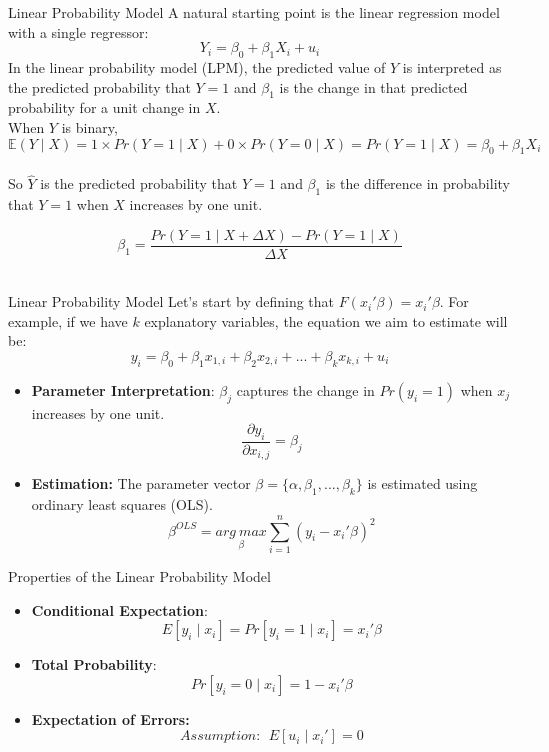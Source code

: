 \documentclass[notes,10pt, aspectratio=169]{beamer}
\begin{document}
\begin{frame}{Linear Probability Model}
A natural starting point is the linear regression model with a single regressor:
\begin{equation*}
    Y_i = \beta_0 + \beta_1 X_i +u_i
\end{equation*}
In the linear probability model (LPM), the predicted value of $Y$ is interpreted as the predicted probability that $Y=1$ and $\beta_1$ is the change in that predicted probability for a unit change in $X$.\\[1em]

When $Y$ is binary,
\begin{equation*}
    \mathbb{E}(Y\mid X) = 1 \times Pr(Y=1\mid X) + 0 \times  Pr(Y=0\mid X) = Pr(Y=1\mid X)= \beta_0 + \beta_1 X_i
\end{equation*}\\[1em]

So $\hat{Y}$ is the predicted probability that $Y=1$ and $\beta_1$ is the difference in probability that $Y=1$ when $X$ increases by one unit.

\begin{equation*}
    \beta_1 = \frac{Pr(Y=1\mid X + \Delta X)-Pr(Y=1\mid X)}{\Delta X}
\end{equation*}\\[1em]
\end{frame}


\begin{frame}{Linear Probability Model}
Let's start by defining that $F(x_i'\beta)=x_i'\beta$. For example, if we have $k$ explanatory variables, the equation we aim to estimate will be:
\[
y_i=\beta_0+\beta_1x_{1,i}+\beta_2x_{2,i}+...+\beta_kx_{k,i}+u_i
\]
\begin{itemize}
    \item \textbf{Parameter Interpretation}: $\beta_j$ captures the change in $Pr(y_i=1)$ when $x_j$ increases by one unit.
    \[\frac{\partial y_i}{\partial x_{i,j}}=\beta_j\]
    \item \textbf{Estimation:} The parameter vector $\beta=\{\alpha, \beta_1,...,\beta_k\}$ is estimated using ordinary least squares (OLS).
    \[
    \beta^{OLS} = \underset{\beta}{arg \ max } \sum_{i=1}^n (y_i-x_i'\beta)^2 
    \]
\end{itemize}
\end{frame}

\begin{frame}{Properties of the Linear Probability Model}
\begin{itemize}
    \item \textbf{Conditional Expectation}: 
    \[
    E[y_i \mid x_i]=Pr[y_i=1 \mid x_i]=x_i'\beta
    \]  
    \item \textbf{Total Probability}: 
    \[
    Pr[y_i=0 \mid x_i]=1-x_i'\beta
    \]
    \item \textbf{Expectation of Errors:}
    \[
    Assumption: \ \ E[u_i \mid x_i']=0 
    \]
\end{itemize}
\end{frame}
\end{document}
